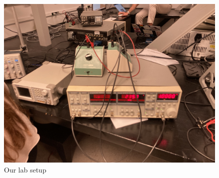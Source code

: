 \documentclass[a4paper]{article}\usepackage[english]{babel}
\begin{document}
\begin{figure}
  \includegraphics[width=\linewidth]{images/lab/setup.JPEG}
  \caption{Our lab setup}
  \label{fig:boat1}
\end{figure}
\end{document}

